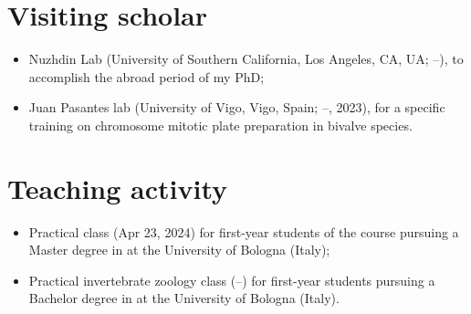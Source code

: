 \section*{Visiting scholar}
\begin{itemize}
	\item Nuzhdin Lab (University of Southern California, Los Angeles, CA, UA; --), to accomplish the abroad period of my PhD;
	\item Juan Pasantes\curlyapostrophe{} lab (University of Vigo, Vigo, Spain;  --, 2023), for a specific training on chromosome mitotic plate preparation in bivalve species.
\end{itemize}

\section*{Teaching activity}
\begin{itemize}
	\item Practical class  (Apr 23, 2024) for first-year students of the course  pursuing a Master degree in  at the University of Bologna (Italy);
	\item Practical invertebrate zoology class (--) for first-year students pursuing a Bachelor degree in  at the University of Bologna (Italy).
\end{itemize}

